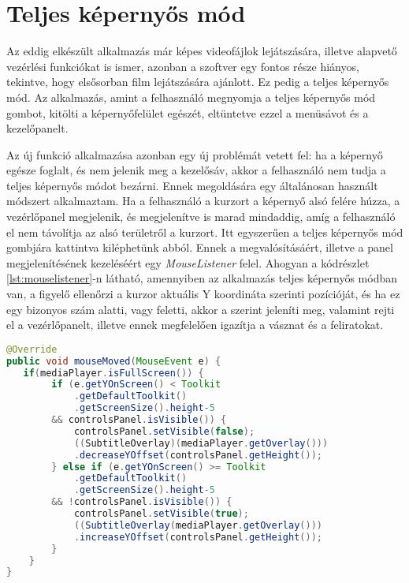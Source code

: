 \section{Teljes képernyős mód}

Az eddig elkészült alkalmazás már képes videofájlok lejátszására, illetve alapvető vezérlési funkciókat is ismer, azonban a szoftver egy fontos része hiányos, tekintve, hogy elsősorban film lejátszására ajánlott. Ez pedig a teljes képernyős mód. Az alkalmazás, amint a felhasználó megnyomja a teljes képernyős mód gombot, kitölti a képernyőfelület egészét, eltüntetve ezzel a menüsávot és a kezelőpanelt.

Az új funkció alkalmazása azonban egy új problémát vetett fel: ha a képernyő egésze foglalt, és nem jelenik meg a kezelősáv, akkor a felhasználó nem tudja a teljes képernyős módot bezárni. Ennek megoldására egy általánosan használt módszert alkalmaztam. Ha a felhasználó a kurzort a képernyő alsó felére húzza, a vezérlőpanel megjelenik, és megjelenítve is marad mindaddig, amíg a felhasználó el nem távolítja az alsó területről a kurzort. Itt egyszerűen a teljes képernyős mód gombjára kattintva kiléphetünk abból. Ennek a megvalósításáért, illetve a panel megjelenítésének kezeléséért egy \textit{MouseListener} felel. Ahogyan a  kódrészlet \ref{lst:mouselistener}-n látható, amennyiben az alkalmazás teljes képernyős módban van, a figyelő ellenőrzi a kurzor aktuális Y koordináta szerinti pozícióját, és ha ez egy bizonyos szám alatti, vagy feletti, akkor a szerint jeleníti meg, valamint rejti el a vezérlőpanelt, illetve ennek megfelelően igazítja a vásznat és a feliratokat.

\begin{spacing}{1.25}
\begin{lstlisting}[caption=A \textit{MouseListener} megvalósítása, label={lst:mouselistener}, language=java]
@Override
public void mouseMoved(MouseEvent e) {
   if(mediaPlayer.isFullScreen()) {
        if (e.getYOnScreen() < Toolkit
            .getDefaultToolkit()
            .getScreenSize().height-5
        && controlsPanel.isVisible()) {
            controlsPanel.setVisible(false);
            ((SubtitleOverlay)(mediaPlayer.getOverlay()))
            .decreaseYOffset(controlsPanel.getHeight());
        } else if (e.getYOnScreen() >= Toolkit
            .getDefaultToolkit()
            .getScreenSize().height-5
        && !controlsPanel.isVisible()) {
            controlsPanel.setVisible(true);
            ((SubtitleOverlay(mediaPlayer.getOverlay()))
            .increaseYOffset(controlsPanel.getHeight());
        }
    }
}
\end{lstlisting}
\end{spacing}

